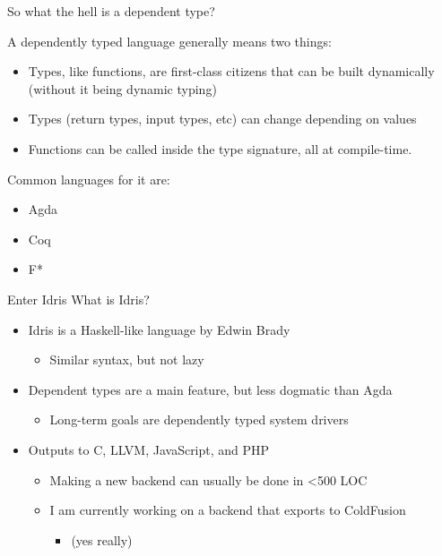 \documentclass{beamer}
\begin{document}
\begin{frame}{So what the hell is a dependent type? }
	\transdissolve[duration=0.17]

	A dependently typed language generally means two things:
	\begin{itemize}	
		\pause
		\item Types, like functions, are first-class citizens that can be built dynamically (without it being dynamic typing)
		\pause
		\item Types (return types, input types, etc) can change depending on values
			\pause
			\item Functions can be called inside the type signature, all at compile-time.
			\pause
	\end{itemize}

	Common languages for it are: 
	\begin{itemize}	
		\item Agda
		\item Coq 
		\item F*
	\end{itemize}
\end{frame}
\begin{frame}{Enter Idris}
	\transdissolve[duration=0.17]
	What is Idris? 
	\begin{itemize}
		\pause
		\item Idris is a Haskell-like language by Edwin Brady \begin{itemize}
				\item Similar syntax, but not lazy
	\end{itemize}
	\pause
     \item Dependent types are a main feature, but less dogmatic than Agda \begin{itemize}
		\item Long-term goals are dependently typed system drivers
	\end{itemize}
		\pause
		\item Outputs to C, LLVM, JavaScript, and PHP \begin{itemize}
				\item Making a new backend can usually be done in \textless 500 LOC
				\pause
				\item I am currently working on a backend that exports to ColdFusion \begin{itemize}
					\pause
					\item[](yes really)
				\end{itemize}
			\end{itemize}
	\end{itemize}
\end{frame}
\end{document}
